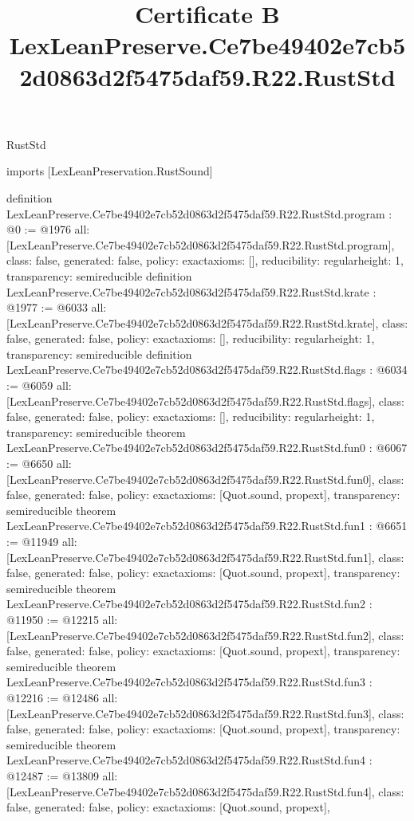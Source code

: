 \begin{lexlean}{RustStd}
\title{Certificate B LexLeanPreserve.Ce7be49402e7cb52d0863d2f5475daf59.R22.RustStd}
\begin{coremodule}
imports [LexLeanPreservation.RustSound]

definition LexLeanPreserve.Ce7be49402e7cb52d0863d2f5475daf59.R22.RustStd.program : @0 := @1976 {
  all: [LexLeanPreserve.Ce7be49402e7cb52d0863d2f5475daf59.R22.RustStd.program],
  class: false,
  generated: false,
  policy: exact{axioms: []},
  reducibility: regular{height: 1},
  transparency: semireducible
}
definition LexLeanPreserve.Ce7be49402e7cb52d0863d2f5475daf59.R22.RustStd.krate : @1977 := @6033 {
  all: [LexLeanPreserve.Ce7be49402e7cb52d0863d2f5475daf59.R22.RustStd.krate],
  class: false,
  generated: false,
  policy: exact{axioms: []},
  reducibility: regular{height: 1},
  transparency: semireducible
}
definition LexLeanPreserve.Ce7be49402e7cb52d0863d2f5475daf59.R22.RustStd.flags : @6034 := @6059 {
  all: [LexLeanPreserve.Ce7be49402e7cb52d0863d2f5475daf59.R22.RustStd.flags],
  class: false,
  generated: false,
  policy: exact{axioms: []},
  reducibility: regular{height: 1},
  transparency: semireducible
}
theorem LexLeanPreserve.Ce7be49402e7cb52d0863d2f5475daf59.R22.RustStd.fun0 : @6067 := @6650 {
  all: [LexLeanPreserve.Ce7be49402e7cb52d0863d2f5475daf59.R22.RustStd.fun0],
  class: false,
  generated: false,
  policy: exact{axioms: [Quot.sound, propext]},
  transparency: semireducible
}
theorem LexLeanPreserve.Ce7be49402e7cb52d0863d2f5475daf59.R22.RustStd.fun1 : @6651 := @11949 {
  all: [LexLeanPreserve.Ce7be49402e7cb52d0863d2f5475daf59.R22.RustStd.fun1],
  class: false,
  generated: false,
  policy: exact{axioms: [Quot.sound, propext]},
  transparency: semireducible
}
theorem LexLeanPreserve.Ce7be49402e7cb52d0863d2f5475daf59.R22.RustStd.fun2 : @11950 := @12215 {
  all: [LexLeanPreserve.Ce7be49402e7cb52d0863d2f5475daf59.R22.RustStd.fun2],
  class: false,
  generated: false,
  policy: exact{axioms: [Quot.sound, propext]},
  transparency: semireducible
}
theorem LexLeanPreserve.Ce7be49402e7cb52d0863d2f5475daf59.R22.RustStd.fun3 : @12216 := @12486 {
  all: [LexLeanPreserve.Ce7be49402e7cb52d0863d2f5475daf59.R22.RustStd.fun3],
  class: false,
  generated: false,
  policy: exact{axioms: [Quot.sound, propext]},
  transparency: semireducible
}
theorem LexLeanPreserve.Ce7be49402e7cb52d0863d2f5475daf59.R22.RustStd.fun4 : @12487 := @13809 {
  all: [LexLeanPreserve.Ce7be49402e7cb52d0863d2f5475daf59.R22.RustStd.fun4],
  class: false,
  generated: false,
  policy: exact{axioms: [Quot.sound, propext]},
}
\end{coremodule}
\end{lexlean}

